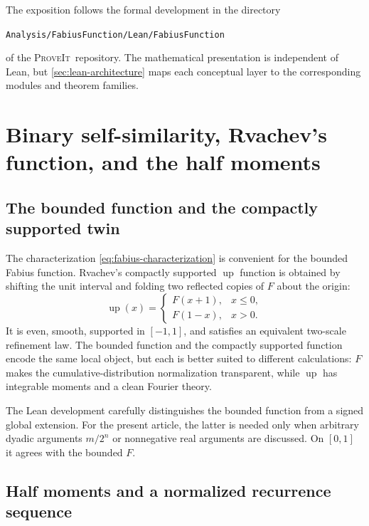 \documentclass[11pt]{article}
\theoremstyle{definition}
\newcommand{\Fabius}{F}
\newcommand{\Up}{\operatorname{up}}
\newcommand{\lean}[1]{\nolinkurl{#1}}
\newcommand{\repo}{\textsc{ProveIt}}
\begin{document}
The exposition follows the formal development in the directory
\begin{center}
  \lean{Analysis/FabiusFunction/Lean/FabiusFunction}
\end{center}
of the \repo\ repository.  The mathematical presentation is independent of Lean, but \cref{sec:lean-architecture} maps each conceptual layer to the corresponding modules and theorem families.

\section{Binary self-similarity, Rvachev's function, and the half moments}
\label{sec:fabius-background}

\subsection{The bounded function and the compactly supported twin}

The characterization \cref{eq:fabius-characterization} is convenient for the bounded Fabius function.  Rvachev's compactly supported $\Up$ function is obtained by shifting the unit interval and folding two reflected copies of $\Fabius$ about the origin:
\begin{equation}
  \Up(x)=
  \begin{cases}
    \Fabius(x+1),&x\le 0,\\
    \Fabius(1-x),&x>0.
  \end{cases}
  \label{eq:up-from-fabius}
\end{equation}
It is even, smooth, supported in $[-1,1]$, and satisfies an equivalent two-scale refinement law.  The bounded function and the compactly supported function encode the same local object, but each is better suited to different calculations: $\Fabius$ makes the cumulative-distribution normalization transparent, while $\Up$ has integrable moments and a clean Fourier theory.

The Lean development carefully distinguishes the bounded function from a signed global extension.  For the present article, the latter is needed only when arbitrary dyadic arguments $m/2^n$ or nonnegative real arguments are discussed.  On $[0,1]$ it agrees with the bounded $\Fabius$.

\subsection{Half moments and a normalized recurrence sequence}
\end{document}
